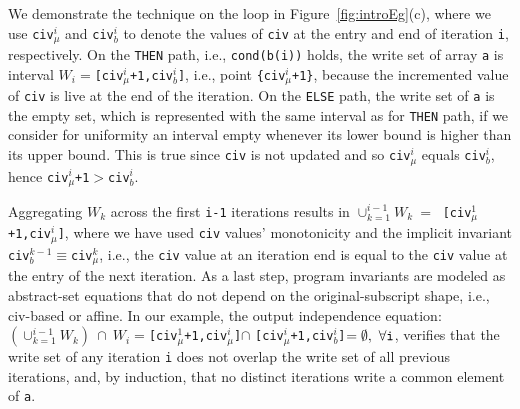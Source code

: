\documentclass{sig-alternate}
\begin{document}
We demonstrate the technique on the loop in Figure~\ref{fig:introEg}(c),
where we use {\tt civ$_\mu^i$} and {\tt civ$_b^i$} to denote the values of 
{\tt civ} at the entry and end of iteration {\tt i}, respectively.
%
On the {\tt THEN} path, i.e., {\tt cond(b(i))} holds, the write set 
of array {\tt a} is interval $W_i=${\tt [civ$_\mu^i$+1,civ$_b^i$]}, 
i.e., point {\tt \{civ$_\mu^i$+1\}}, because the incremented value 
of {\tt civ} is live at the end of the iteration. 
%
On the {\tt ELSE} path, the write set of {\tt a} is the empty set,
which is represented with the same interval as for {\tt THEN} path, 
if we consider for uniformity an interval empty whenever 
its lower bound is higher than its upper bound. 
%
This is true since {\tt civ} is not updated and so
{\tt civ$_\mu^i$} equals {\tt civ$_b^i$}, hence 
{\tt civ$_\mu^i$+1$ > $civ$_b^i$}.
%

Aggregating $W_k$ across the first {\tt i-1} iterations results in
$\cup_{k=1}^{i-1}W_k \ = \ $ {\tt [civ$_\mu^1$+1,civ$_\mu^i$]}, 
where we have used {\tt civ} values'
monotonicity and the implicit invariant {\tt civ$_b^{k-1}\equiv$civ$_\mu^{k}$},
i.e., the {\tt civ} value at an iteration end is equal to the {\tt civ}
value at the entry of the next iteration. 
%
%
As a last step, program invariants are modeled as abstract-set equations
that do not depend on the original-subscript shape, i.e., 
{\sc civ}-based or affine. 
%
In our example, the output independence equation:\\
$(\cup_{k=1}^{i-1}W_k)~\cap~W_i = ${\tt [civ$_\mu^1$+1,civ$_\mu^i$]}$\cap$
{\tt [civ$_\mu^i$+1,civ$_b^i$]}$ = \emptyset,~\forall \mbox{\tt{}i}$,
verifies that the write set of any iteration {\tt i} does not overlap
the write set of all previous iterations, and, by induction,
that no distinct iterations write a common element of {\tt a}.
\end{document}
